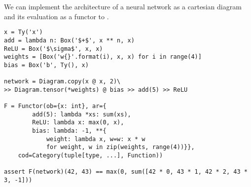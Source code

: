 \begin{example}
We can implement the architecture of a neural network as a cartesian diagram and its evaluation as a functor to .

\begin{verbatim}
x = Ty('x')
add = lambda n: Box('$+$', x ** n, x)
ReLU = Box('$\sigma$', x, x)
weights = [Box('w{}'.format(i), x, x) for i in range(4)]
bias = Box('b', Ty(), x)

network = Diagram.copy(x @ x, 2)\
>> Diagram.tensor(*weights) @ bias >> add(5) >> ReLU

F = Functor(ob={x: int}, ar={
        add(5): lambda *xs: sum(xs),
        ReLU: lambda x: max(0, x),
        bias: lambda: -1, **{
            weight: lambda x, w=w: x * w
            for weight, w in zip(weights, range(4))}},
    cod=Category(tuple[type, ...], Function))

assert F(network)(42, 43) == max(0, sum([42 * 0, 43 * 1, 42 * 2, 43 * 3, -1]))
\end{verbatim}
\end{example}

